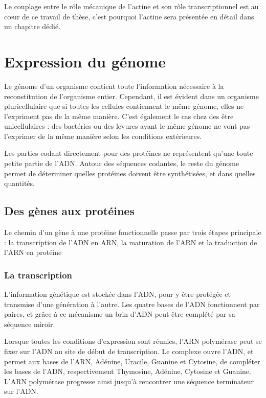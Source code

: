 \documentclass{report}
\begin{document}
Le couplage entre le rôle mécanique de l'actine et son rôle transcriptionnel est au c\oe ur de ce travail de thèse, c'est pourquoi l'actine sera présentée en détail dans un chapitre dédié. 




\section{Expression du génome}

Le génome d'un organisme contient toute l'information nécessaire à la reconstitution de l'organisme entier. Cependant, il est évident dans un organisme pluricellulaire que si toutes les cellules contiennent le même génome, elles ne l'expriment pas de la même manière. C'est également le cas chez des être unicellulaires : des bactéries ou des levures ayant le même génome ne vont pas l'exprimer de la même manière selon les conditions extérieures. 

Les parties codant directement pour des protéines ne représentent qu'une toute petite partie de l'ADN. Autour des séquences codantes, le reste du génome permet de déterminer quelles protéines doivent être synthétisées, et dans quelles quantités. 

\subsection{Des gènes aux protéines}

Le chemin d'un gène à une protéine fonctionnelle passe par trois étapes principale : la transcription de l'ADN en ARN, la maturation de l'ARN et la traduction de l'ARN en protéine 

\subsubsection{La transcription}

L'information génétique est stockée dans l'ADN, pour y être protégée et transmise d'une génération à l'autre. Les quatre bases de l'ADN fonctionnent par paires, et grâce à ce mécanisme un brin d'ADN peut être complété par sa séquence miroir. 

Lorsque toutes les conditions d'expression sont réunies, l'ARN polymérase peut se fixer sur l'ADN au site de début de transcription. Le complexe ouvre l'ADN, et permet aux bases de l'ARN, Adénine, Uracile, Guanine et Cytosine, de compléter les bases de l'ADN, respectivement Thymosine, Adénine, Cytosine et Guanine. L'ARN polymérase progresse ainsi jusqu'à rencontrer une séquence terminateur sur l'ADN. 
\end{document}
